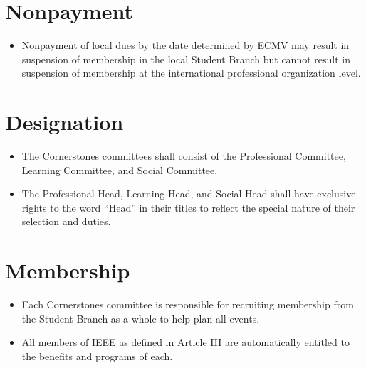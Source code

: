 \documentclass[12pt]{constitution}
\begin{document}
\section{Nonpayment}
\label{sec:dues_nonpay}
\begin{itemize}
    \item Nonpayment of local dues by the date determined by ECMV may result in suspension of membership in the local Student Branch but cannot result in suspension of membership at the international professional organization level.
\end{itemize}


\label{art:cornerstones}

\section{Designation}
\label{sec:corner_desig}
\begin{itemize}
    \item The Cornerstones committees shall consist of the Professional Committee, Learning Committee, and Social Committee.
    \item The Professional Head, Learning Head, and Social Head shall have exclusive rights to the word ``Head'' in their titles to reflect the special nature of their selection and duties.
\end{itemize}

\section{Membership}
\label{sec:corner_auto}
\begin{itemize}
    \item Each Cornerstones committee is responsible for recruiting membership from the Student Branch as a whole to help plan all events.
    \item All members of IEEE as defined in Article III are automatically entitled to the benefits and programs of each.
\end{itemize}
\end{document}
